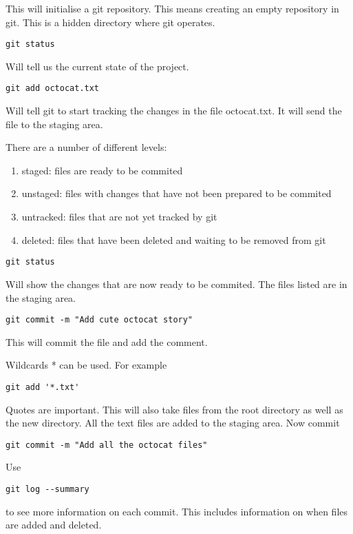 \documentclass[11pt]{article} %
\begin{document}
This will initialise a git repository. This means creating an empty repository in git.  This is a hidden directory where git operates. 

\begin{lstlisting}
git status
\end{lstlisting}

Will tell us the current state of the project. 

\begin{lstlisting}
git add octocat.txt 
\end{lstlisting}

Will tell git to start tracking the changes in the file octocat.txt.  It will send the file to the staging area. 

There are a number of different levels: 
\begin{enumerate}
\item staged:  files are ready to be commited
\item unstaged: files with changes that have not been prepared to be commited
\item untracked: files that are not yet tracked by git
\item deleted:  files that have been deleted and waiting to be removed from git
\end{enumerate}

 \begin{lstlisting}
git status 
\end{lstlisting}
 Will show the changes that are now ready to be commited.  The files listed are in the staging area. 

\begin{lstlisting}
git commit -m "Add cute octocat story" 
\end{lstlisting}

This will commit the file and add the comment. 

Wildcards * can be used.  For example 
\begin{lstlisting}
git add '*.txt' 
\end{lstlisting}
Quotes are important.  This will also take files from the root directory as well as the new directory.  All the text files are added to the staging area. Now commit
\begin{lstlisting}
git commit -m "Add all the octocat files" 
\end{lstlisting}

Use 
\begin{lstlisting}
git log --summary 
\end{lstlisting}
to see more information on each commit.  This includes information on when files are added and deleted. 
\end{document}
